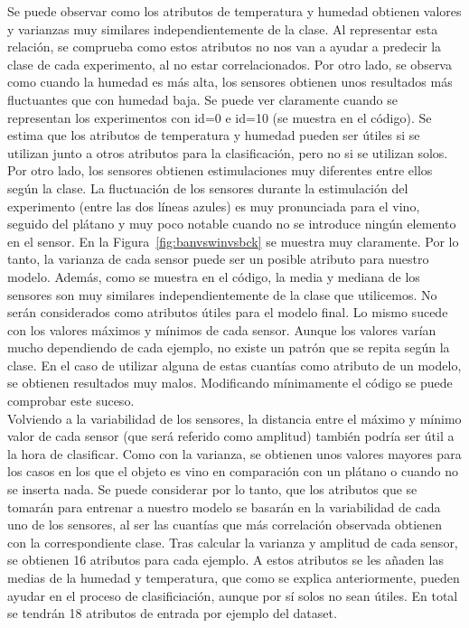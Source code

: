 \documentclass{esannV2}
\begin{document}
Se puede observar como los atributos de temperatura y humedad obtienen valores  y varianzas muy similares independientemente de la clase. Al representar esta relación, se comprueba como estos atributos no nos van a ayudar a predecir la clase de cada experimento, al no estar correlacionados. Por otro lado, se observa como cuando la humedad es más alta, los sensores obtienen unos resultados más fluctuantes que con humedad baja. Se puede ver claramente cuando se representan los experimentos con id=0 e id=10 (se muestra en el código). Se estima que los atributos de temperatura y humedad pueden ser útiles si se utilizan junto a otros atributos para la clasificación, pero no si se utilizan solos. \\

Por otro lado, los sensores obtienen estimulaciones muy diferentes entre ellos según la clase. La fluctuación de los sensores durante la estimulación del experimento (entre las dos líneas azules)  es muy pronunciada para el vino, seguido del plátano y muy poco notable cuando no se introduce ningún elemento en el sensor. En la Figura~\ref{fig:banvswinvsbck} se muestra muy claramente. Por lo tanto, la varianza de cada sensor puede ser un posible atributo para nuestro modelo.  Además, como se muestra en el código, la media y mediana de los sensores son muy similares independientemente de la clase que utilicemos. No serán considerados como atributos útiles para el modelo final. Lo mismo sucede con los valores máximos y mínimos de cada sensor. Aunque los valores varían mucho dependiendo de cada ejemplo, no existe un patrón que se repita según la clase. En el caso de utilizar alguna de estas cuantías como atributo de un modelo, se obtienen resultados muy malos. Modificando mínimamente el código se puede comprobar este suceso. \\

Volviendo a la variabilidad de los sensores, la distancia entre el máximo y mínimo valor de cada sensor (que será referido como amplitud) también podría ser útil a la hora de clasificar. Como con la varianza, se obtienen unos valores mayores para los casos en los que el objeto es vino en comparación con un plátano o cuando no se inserta nada.  Se puede considerar por lo tanto, que los atributos que se tomarán para entrenar a nuestro modelo se basarán en la variabilidad de cada uno de los sensores, al ser las cuantías que más correlación observada obtienen con la correspondiente clase. Tras calcular  la varianza y amplitud de cada sensor, se obtienen 16 atributos para cada ejemplo. A estos atributos se les añaden las medias de la humedad y temperatura, que como se explica anteriormente, pueden ayudar en el proceso de clasificiación, aunque por sí solos no sean útiles. En total se tendrán 18 atributos de entrada por ejemplo del dataset.\\
\end{document}
